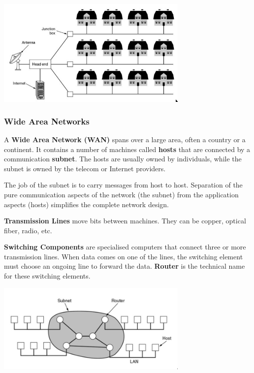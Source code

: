 \documentclass[11pt]{article}
\begin{document}
\begin{center}
    \includegraphics[width=0.7\textwidth]{man-diagram.png}
\end{center}

\subsubsection{Wide Area Networks}
A \textbf{Wide Area Network (WAN)} spans over a large area, often a country or a continent. 
It contains a number of machines called \textbf{hosts} that are connected by a communication \textbf{subnet}.
The hosts are usually owned by individuals, while the subnet is owned by the telecom or Internet providers. 

The job of the subnet is to carry messages from host to host. 
Separation of the pure communication aspects of the network (the subnet) from the application aspects (hosts) simplifies the 
complete network design. 

\textbf{Transmission Lines} move bits between machines. 
They can be copper, optical fiber, radio, etc. 

\textbf{Switching Components} are specialised computers that connect three or more transmission lines. 
When data comes on one of the lines, the switching element must choose an ongoing line to forward the data. 
\textbf{Router} is the technical name for these switching elements. 

\begin{center}
    \includegraphics[width=0.7\textwidth]{wan-diagram.png}
\end{center}
\end{document}
